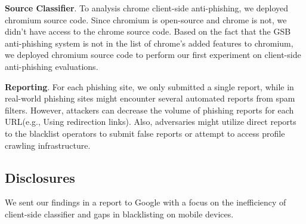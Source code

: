 \textbf{Source Classifier}. To analysis chrome client-side anti-phishing, we deployed chromium source code. Since chromium is open-source and chrome is not, we didn't have access to the chrome source code. Based on the fact that the GSB anti-phishing system is not in the list of chrome's added features to chromium, we deployed chromium source code to perform our first experiment on client-side anti-phishing evaluations. 

\textbf{Reporting}. For each phishing site, we only submitted a single report, while in real-world phishing sites might encounter several automated reports from spam filters. However,  attackers can decrease the volume of phishing reports for each URL(e.g., Using redirection links).
Also, adversaries might utilize direct reports to the blacklist
operators to submit false reports or attempt to access profile crawling infrastructure.

\subsection{Disclosures}

We sent our findings in a report to Google with a focus on the inefficiency of client-side classifier and gaps in blacklisting on mobile devices. 
